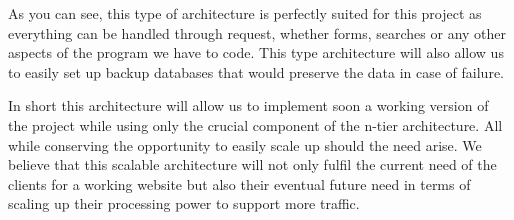 As you can see, this type of architecture is perfectly suited for this
project as everything can be handled through request, whether forms, searches
or any other aspects of the program we have to code. This type architecture will
also allow us to easily set up backup databases that would preserve the
data in case of failure. \newline

In short this architecture will allow us to implement soon a working
version of the project while using only the crucial component of the n-tier
architecture. All while conserving the opportunity to easily scale up
should the need arise. We believe that this scalable architecture will not
only fulfil the current need of the clients for a working website but also
their eventual future need in terms of scaling up their processing power to
support more traffic.
